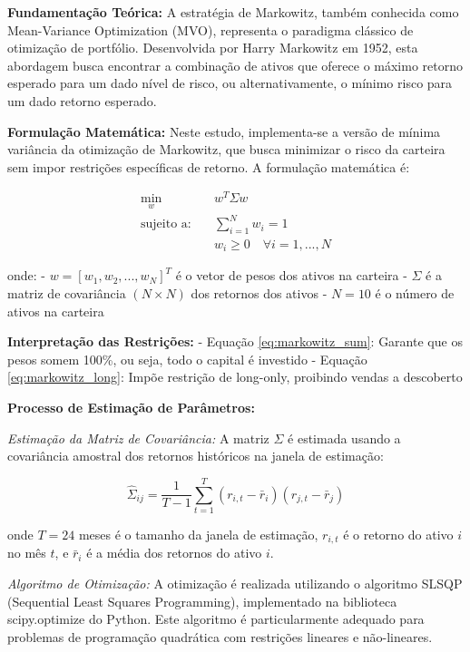 \textbf{Fundamentação Teórica:} A estratégia de Markowitz, também conhecida como Mean-Variance Optimization (MVO), representa o paradigma clássico de otimização de portfólio. Desenvolvida por Harry Markowitz em 1952, esta abordagem busca encontrar a combinação de ativos que oferece o máximo retorno esperado para um dado nível de risco, ou alternativamente, o mínimo risco para um dado retorno esperado.

\textbf{Formulação Matemática:} Neste estudo, implementa-se a versão de mínima variância da otimização de Markowitz, que busca minimizar o risco da carteira sem impor restrições específicas de retorno. A formulação matemática é:

\begin{align}
\min_{w} \quad & w^T \Sigma w \label{eq:markowitz_obj} \\
\text{sujeito a:} \quad & \sum_{i=1}^{N} w_i = 1 \label{eq:markowitz_sum} \\
& w_i \geq 0 \quad \forall i = 1, ..., N \label{eq:markowitz_long}
\end{align}

onde:
- $w = [w_1, w_2, ..., w_N]^T$ é o vetor de pesos dos ativos na carteira
- $\Sigma$ é a matriz de covariância $(N \times N)$ dos retornos dos ativos
- $N = 10$ é o número de ativos na carteira

\textbf{Interpretação das Restrições:}
- Equação \ref{eq:markowitz_sum}: Garante que os pesos somem 100\%, ou seja, todo o capital é investido
- Equação \ref{eq:markowitz_long}: Impõe restrição de long-only, proibindo vendas a descoberto

\textbf{Processo de Estimação de Parâmetros:}

\textit{Estimação da Matriz de Covariância:} A matriz $\Sigma$ é estimada usando a covariância amostral dos retornos históricos na janela de estimação:

\begin{equation}
\hat{\Sigma}_{ij} = \frac{1}{T-1} \sum_{t=1}^{T} (r_{i,t} - \bar{r}_i)(r_{j,t} - \bar{r}_j)
\end{equation}

onde $T = 24$ meses é o tamanho da janela de estimação, $r_{i,t}$ é o retorno do ativo $i$ no mês $t$, e $\bar{r}_i$ é a média dos retornos do ativo $i$.

\textit{Algoritmo de Otimização:} A otimização é realizada utilizando o algoritmo SLSQP (Sequential Least Squares Programming), implementado na biblioteca scipy.optimize do Python. Este algoritmo é particularmente adequado para problemas de programação quadrática com restrições lineares e não-lineares.

